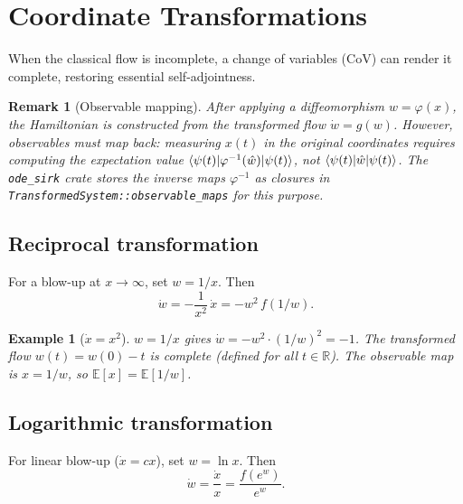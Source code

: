 \documentclass[11pt,a4paper]{article}
\newtheorem{remark}{Remark}
\newtheorem{example}{Example}
\newcommand{\Rset}{\mathbb{R}}
\newcommand{\Eset}{\mathbb{E}}
\begin{document}
\section{Coordinate Transformations}\label{sec:cov}

When the classical flow is incomplete, a change of variables (CoV) can
render it complete, restoring essential self-adjointness.

\begin{remark}[Observable mapping]
After applying a diffeomorphism $w=\varphi(x)$, the Hamiltonian is
constructed from the transformed flow $\dot{w}=g(w)$.  However,
\emph{observables must map back}: measuring $x(t)$ in the original
coordinates requires computing the expectation value
$\braket{\psi(t)|\varphi^{-1}(\hat{w})|\psi(t)}$, not
$\braket{\psi(t)|\hat{w}|\psi(t)}$.  The \texttt{ode\_sirk} crate stores
the inverse maps $\varphi^{-1}$ as closures in
\texttt{TransformedSystem::observable\_maps} for this purpose.
\end{remark}

\subsection{Reciprocal transformation}

For a blow-up at $x\to\infty$, set $w=1/x$.  Then
\begin{equation}\label{eq:reciprocal}
  \dot{w}=-\frac{1}{x^{2}}\,\dot{x}=-w^{2}\,f(1/w).
\end{equation}

\begin{example}[$\dot{x}=x^{2}$]
$w=1/x$ gives $\dot{w}=-w^{2}\cdot(1/w)^{2}=-1$.  The transformed flow
$w(t)=w(0)-t$ is \emph{complete} (defined for all $t\in\Rset$).  The
observable map is $x=1/w$, so $\Eset[x]=\Eset[1/w]$.
\end{example}

\subsection{Logarithmic transformation}

For linear blow-up ($\dot{x}=cx$), set $w=\ln x$.  Then
\begin{equation}\label{eq:logarithmic}
  \dot{w}=\frac{\dot{x}}{x}=\frac{f(e^{w})}{e^{w}}.
\end{equation}
\end{document}

